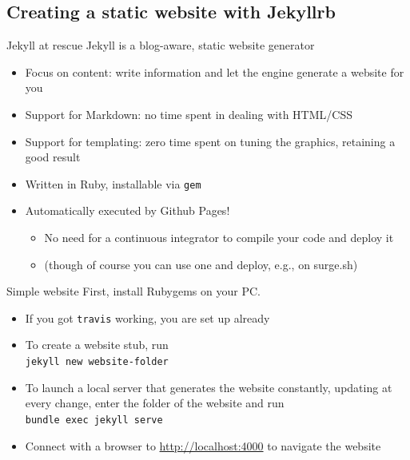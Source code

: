 \documentclass[presentation]{beamer}
\begin{document}
\subsection{Creating a static website with Jekyllrb}

\begin{frame}{Jekyll at rescue}
    Jekyll is a blog-aware, static website generator
    \begin{itemize}
        \item Focus on content: write information and let the engine generate a website for you
        \item Support for Markdown: no time spent in dealing with HTML/CSS
        \item Support for templating: zero time spent on tuning the graphics, retaining a good result
        \item Written in Ruby, installable via \texttt{gem}
        \item Automatically executed by Github Pages!
        \begin{itemize}
            \item No need for a continuous integrator to compile your code and deploy it
            \item (though of course you can use one and deploy, e.g., on surge.sh)
        \end{itemize}
    \end{itemize}
\end{frame}

\begin{frame}{Simple website}
    First, install Rubygems on your PC.
    \begin{itemize}
        \item If you got \texttt{travis} working, you are set up already
        \item To create a website stub, run\\ \texttt{jekyll new website-folder}
        \item To launch a local server that generates the website constantly, updating at every change, enter the folder of the website and run \\ \texttt{bundle exec jekyll serve}
        \item Connect with a browser to \url{http://localhost:4000} to navigate the website
    \end{itemize}
\end{frame}
\end{document}
